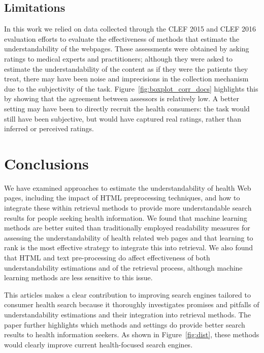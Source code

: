 \subsection*{Limitations}
In this work we relied on data collected through the CLEF 2015 and CLEF 2016 evaluation efforts to evaluate the effectiveness of methods that estimate the understandability of the webpages. These assessments were obtained by asking ratings to medical experts and practitioners; although they were asked to estimate the understandability of the content as if they were the patients they treat, there may have been noise and imprecisions in the collection mechanism due to the subjectivity of the task. Figure~\ref{fig:boxplot_corr_docs} highlights this by showing that the agreement between assessors is relatively low. A better setting may have been to directly recruit the health consumers: the task would still have been subjective, but would have captured real ratings, rather than inferred or perceived ratings. 


\section*{Conclusions}

We have examined approaches to estimate the understandability of health Web pages, including the impact of HTML preprocessing techniques, and how to integrate these within retrieval methods to provide more understandable search results for people seeking health information. We found that machine learning methods are better suited than traditionally employed readability measures for assessing the understandability of health related web pages and that learning to rank is the most effective strategy to integrate this into retrieval. We also found that HTML and text pre-processing do affect effectiveness of both understandability estimations and of the retrieval process, although machine learning methods are less sensitive to this issue.

This articles makes a clear contribution to improving search engines tailored to consumer health search because it thoroughly investigates promises and pitfalls of understandability estimations and their integration into retrieval methods. The paper further highlights which methods and settings do provide better search results to health information seekers. As shown in Figure~\ref{fig:dist}, these methods would clearly improve current health-focused search engines. 